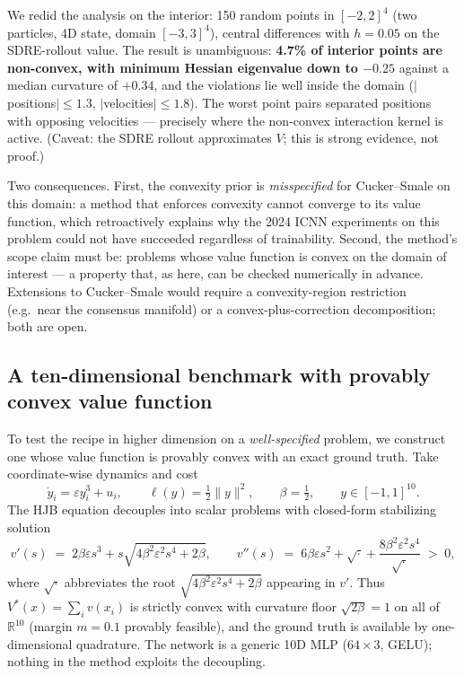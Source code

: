 \documentclass[11pt,a4paper]{article}
\newcommand{\R}{\mathbb{R}}
\begin{document}
We redid the analysis on the interior: 150 random points in $[-2,2]^4$
(two particles, 4D state, domain $[-3,3]^4$), central differences with
$h = 0.05$ on the SDRE-rollout value. The result is unambiguous:
\textbf{4.7\% of interior points are non-convex, with minimum Hessian
eigenvalue down to $-0.25$} against a median curvature of $+0.34$, and the
violations lie well inside the domain ($|$positions$| \le 1.3$,
$|$velocities$| \le 1.8$). The worst point pairs separated positions with
opposing velocities --- precisely where the non-convex interaction kernel is
active. (Caveat: the SDRE rollout approximates $V$; this is strong evidence,
not proof.)

Two consequences. First, the convexity prior is \emph{misspecified} for
Cucker--Smale on this domain: a method that enforces convexity cannot
converge to its value function, which retroactively explains why the 2024
ICNN experiments on this problem could not have succeeded regardless of
trainability. Second, the method's scope claim must be: problems whose value
function is convex on the domain of interest --- a property that, as here,
can be checked numerically in advance. Extensions to Cucker--Smale would
require a convexity-region restriction (e.g.\ near the consensus manifold)
or a convex-plus-correction decomposition; both are open.

\subsection{A ten-dimensional benchmark with provably convex value function}
\label{sec:nd}

To test the recipe in higher dimension on a \emph{well-specified} problem,
we construct one whose value function is provably convex with an exact
ground truth. Take coordinate-wise dynamics and cost
\begin{equation}
  \dot y_i = \varepsilon y_i^3 + u_i, \qquad
  \ell(y) = \tfrac12 \|y\|^2, \qquad \beta = \tfrac12, \qquad
  y \in [-1,1]^{10}.
\end{equation}
The HJB equation decouples into scalar problems with closed-form stabilizing
solution
\begin{equation}
  v'(s) \;=\; 2\beta\varepsilon s^3 + s \sqrt{4\beta^2 \varepsilon^2 s^4 + 2\beta},
  \qquad
  v''(s) \;=\; 6\beta\varepsilon s^2 + \sqrt{\cdot}
  + \frac{8\beta^2\varepsilon^2 s^4}{\sqrt{\cdot}} \;>\; 0,
\end{equation}
where $\sqrt{\cdot}$ abbreviates the root $\sqrt{4\beta^2\varepsilon^2 s^4 +
2\beta}$ appearing in $v'$. Thus $V^*(x) = \sum_i v(x_i)$ is strictly convex
with curvature floor
$\sqrt{2\beta} = 1$ on all of $\R^{10}$ (margin $m = 0.1$ provably
feasible), and the ground truth is available by one-dimensional quadrature.
The network is a generic 10D MLP ($64\times3$, GELU); nothing in the method
exploits the decoupling.
\end{document}

